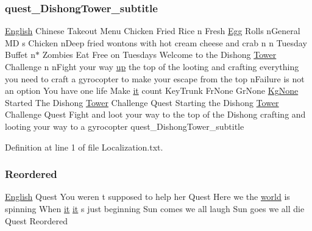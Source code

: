 \subsubsection{\texorpdfstring{quest\_DishongTower\_subtitle}{quest\_DishongTower\_subtitle}}
{\footnotesize\ttfamily \mbox{\hyperlink{_sphere_i_i_01_winter_01_project_2_config_2_localization_8txt_ad896b63205779b1b09e86d941ce13976}{English}} Chinese Takeout Menu Chicken Fried Rice n Fresh \mbox{\hyperlink{_sphere_i_i_01_winter_01_project_2_config_2_localization_8txt_a55334ab0b48a68a93004334728020f15}{Egg}} Rolls n\+General MD s Chicken n\+Deep fried wontons with hot cream cheese and crab n n Tuesday Buffet n$\ast$ Zombies Eat Free on Tuesdays Welcome to the Dishong \mbox{\hyperlink{_dishong_01_tower_01_challenge_2_config_2_localization_8txt_ad03a7286db82f171f8e82a1eaf4e3eaf}{Tower}} Challenge n n\+Fight your way \mbox{\hyperlink{_the_01_restless_01_curse_2_config_2_localization_01-_01_quest_8txt_a2f8d5a9cc6c08e259de10d34d28f85c4}{up}} the top of the looting and crafting everything you need to craft a gyrocopter to make your escape from the top n\+Failure is not an option You have one life Make \mbox{\hyperlink{_the_01_restless_01_curse_2_config_2_localization_01-_01_quest_8txt_a741b285909bea4855b886664c2dcd50c}{it}} count Key\+Trunk Fr\+None Gr\+None \mbox{\hyperlink{_the_01_restless_01_curse_2_config_2_localization_8txt_acc1c43e0980c5828bcfaf85313744919}{Kg\+None}} Started The Dishong \mbox{\hyperlink{_dishong_01_tower_01_challenge_2_config_2_localization_8txt_ad03a7286db82f171f8e82a1eaf4e3eaf}{Tower}} Challenge Quest Starting the Dishong \mbox{\hyperlink{_dishong_01_tower_01_challenge_2_config_2_localization_8txt_ad03a7286db82f171f8e82a1eaf4e3eaf}{Tower}} Challenge Quest Fight and loot your way to the top of the Dishong crafting and looting your way to a gyrocopter quest\+\_\+\+Dishong\+Tower\+\_\+subtitle}



Definition at line 1 of file Localization.\+txt.

\mbox{\label{_dishong_01_tower_01_challenge_2_config_2_localization_8txt_ad8764ed6c4f3231b4fa4631a45680a42}} 
\subsubsection{\texorpdfstring{Reordered}{Reordered}}
{\footnotesize\ttfamily \mbox{\hyperlink{_sphere_i_i_01_winter_01_project_2_config_2_localization_8txt_ad896b63205779b1b09e86d941ce13976}{English}} Quest You weren t supposed to help her Quest Here we the \mbox{\hyperlink{_sphere_i_i_01_music_01_boxes_2_config_2_localization_8txt_a7ede01351426b1b7f6c1ce5f794e474f}{world}} is spinning When \mbox{\hyperlink{_the_01_restless_01_curse_2_config_2_localization_01-_01_quest_8txt_a741b285909bea4855b886664c2dcd50c}{it}} \mbox{\hyperlink{_the_01_restless_01_curse_2_config_2_localization_01-_01_quest_8txt_a741b285909bea4855b886664c2dcd50c}{it}} s just beginning Sun comes we all laugh Sun goes we all die Quest Reordered}



